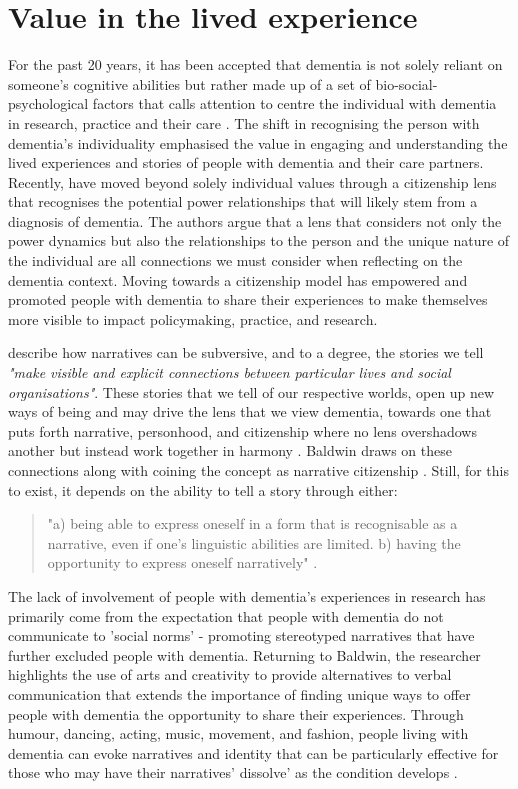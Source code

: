 \section{Value in the lived experience}
\label{Method:experience}
For the past 20 years, it has been accepted that dementia is not solely reliant on someone's cognitive abilities but rather made up of a set of bio-social-psychological factors that calls attention to centre the individual with dementia in research, practice and their care \citep{dewing_personhood_2008}. The shift in recognising the person with dementia's individuality emphasised the value in engaging and understanding the lived experiences and stories of people with dementia and their care partners. Recently, \cite{bartlett_personhood_2007} have moved beyond solely individual values through a citizenship lens that recognises the potential power relationships that will likely stem from a diagnosis of dementia. The authors argue that a lens that considers not only the power dynamics but also the relationships to the person and the unique nature of the individual are all connections we must consider when reflecting on the dementia context. Moving towards a citizenship model has empowered and promoted people with dementia to share their experiences to make themselves more visible to impact policymaking, practice, and research. 

\cite{ewick_subversive_1995} describe how narratives can be subversive, and to a degree, the stories we tell \textit{"make visible and explicit connections between particular lives and social organisations"}. These stories that we tell of our respective worlds, open up new ways of being and may drive the lens that we view dementia, towards one that puts forth narrative, personhood, and citizenship where no lens overshadows another but instead work together in harmony \citep{dupuis_re-claiming_2016}. Baldwin draws on these connections along with coining the concept as narrative citizenship \citep{baldwin_narrative_2008}. Still, for this to exist, it depends on the ability to tell a story through either:
\begin{quote}
 "a) being able to express oneself in a form that is recognisable as a narrative, even if one's linguistic abilities are limited. 
b) having the opportunity to express oneself narratively" \citep{baldwin_narrative_2008}.  
\end{quote}


The lack of involvement of people with dementia's experiences in research has primarily come from the expectation that people with dementia do not communicate to 'social norms' - promoting stereotyped narratives that have further excluded people with dementia. Returning to Baldwin, the researcher highlights the use of arts and creativity to provide alternatives to verbal communication that extends the importance of finding unique ways to offer people with dementia the opportunity to share their experiences. Through humour, dancing, acting, music, movement, and fashion, people living with dementia can evoke narratives and identity that can be particularly effective for those who may have their narratives' dissolve' as the condition develops \cite{john_killick_claire_craig_creativity_2012}. 

